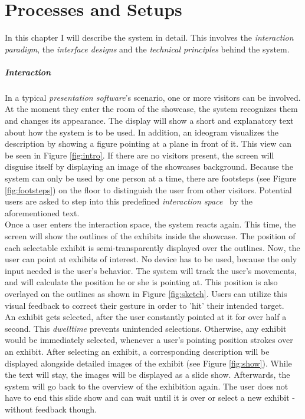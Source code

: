\chapter{Processes and Setups}
\label{installation}

In this chapter I will describe the system in detail. This involves the \textit{interaction paradigm}, the \textit{interface designs} and the \textit{technical principles} behind the system. 

\paragraph{Interaction} 
In a typical \textit{presentation software}'s scenario, one or more visitors can be involved. At the moment they enter the room of the showcase, the system recognizes them and changes its appearance. The display will show a short and explanatory text about how the system is to be used. In addition, an ideogram visualizes the description by showing a figure pointing at a plane in front of it. This view can be seen in Figure \ref{fig:intro}. If there are no visitors present, the screen will disguise itself by displaying an image of the showcases background. Because the system can only be used by one person at a time, there are footsteps (see Figure \ref{fig:footsteps}) on the floor to distinguish the user from other visitors. Potential users are asked to step into this predefined \textit{interaction space}~\cite{UrbanHCI} by the aforementioned text.
\\
Once a user enters the interaction space, the system reacts again. This time, the screen will show the outlines of the exhibits inside the showcase. The position of each selectable exhibit is semi-transparently displayed over the outlines. Now, the user can point at exhibits of interest. No device has to be used, because the only input needed is the user's behavior. The system will track the user's movements, and will calculate the position he or she is pointing at. This position is also overlayed on the outlines as shown in Figure \ref{fig:sketch}. Users can utilize this visual feedback to correct their gesture in order to 'hit' their intended target.
\\
An exhibit gets selected, after the user constantly pointed at it for over half a second. This \textit{dwelltime} prevents unintended selections. Otherwise, any exhibit would be immediately selected, whenever a user's pointing position strokes over an exhibit. After selecting an exhibit, a corresponding description will be displayed alongside detailed images of the exhibit (see Figure \ref{fig:show}). While the text will stay, the images will be displayed as a slide show. Afterwards, the system will go back to the overview of the exhibition again. The user does not have to end this slide show and can wait until it is over or select a new exhibit - without feedback though.
